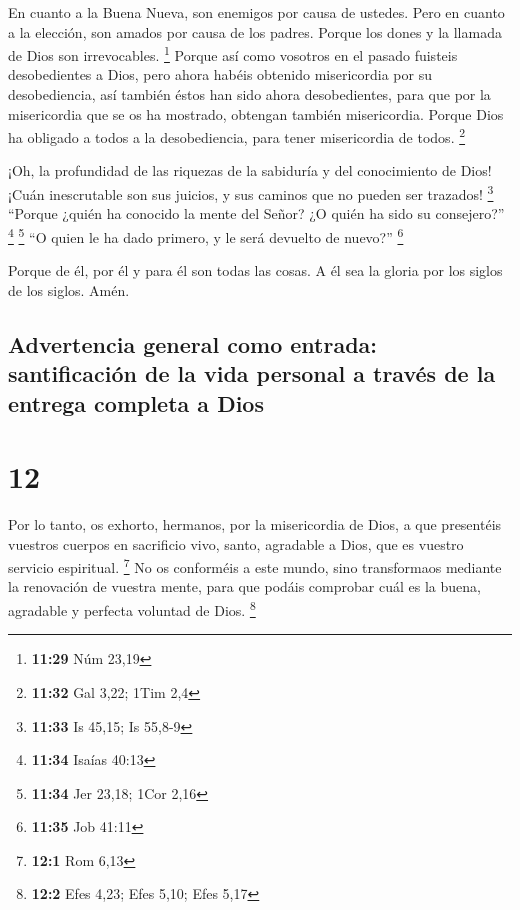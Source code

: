  En cuanto a la Buena Nueva, son enemigos por causa de
ustedes. Pero en cuanto a la elección, son amados por causa de los
padres.  Porque los dones y la llamada de Dios son
irrevocables. \footnote{\textbf{11:29} Núm 23,19}  Porque
así como vosotros en el pasado fuisteis desobedientes a Dios, pero ahora
habéis obtenido misericordia por su desobediencia,  así
también éstos han sido ahora desobedientes, para que por la misericordia
que se os ha mostrado, obtengan también misericordia. 
Porque Dios ha obligado a todos a la desobediencia, para tener
misericordia de todos. \footnote{\textbf{11:32} Gal 3,22; 1Tim 2,4}

 ¡Oh, la profundidad de las riquezas de la sabiduría y
del conocimiento de Dios! ¡Cuán inescrutable son sus juicios, y sus
caminos que no pueden ser trazados! \footnote{\textbf{11:33} Is 45,15;
  Is 55,8-9}  ``Porque ¿quién ha conocido la mente del
Señor? ¿O quién ha sido su consejero?'' \footnote{\textbf{11:34} Isaías
  40:13} \footnote{\textbf{11:34} Jer 23,18; 1Cor 2,16} 
``O quien le ha dado primero, y le será devuelto de nuevo?'' \footnote{\textbf{11:35}
  Job 41:11}

 Porque de él, por él y para él son todas las cosas. A él
sea la gloria por los siglos de los siglos. Amén.

\hypertarget{advertencia-general-como-entrada-santificaciuxf3n-de-la-vida-personal-a-travuxe9s-de-la-entrega-completa-a-dios}{%
\subsection{Advertencia general como entrada: santificación de la vida
personal a través de la entrega completa a
Dios}\label{advertencia-general-como-entrada-santificaciuxf3n-de-la-vida-personal-a-travuxe9s-de-la-entrega-completa-a-dios}}

\hypertarget{section-11}{%
\section{12}\label{section-11}}

 Por lo tanto, os exhorto, hermanos, por la misericordia
de Dios, a que presentéis vuestros cuerpos en sacrificio vivo, santo,
agradable a Dios, que es vuestro servicio espiritual. \footnote{\textbf{12:1}
  Rom 6,13}  No os conforméis a este mundo, sino
transformaos mediante la renovación de vuestra mente, para que podáis
comprobar cuál es la buena, agradable y perfecta voluntad de Dios.
\footnote{\textbf{12:2} Efes 4,23; Efes 5,10; Efes 5,17}

